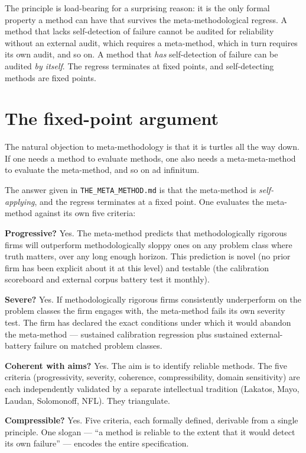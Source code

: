 \documentclass[11pt,letterpaper]{article}
\newcommand{\file}[1]{\texttt{#1}}
\begin{document}
The principle is load-bearing for a surprising reason: it is the only formal property a method can have that survives the meta-methodological regress. A method that lacks self-detection of failure cannot be audited for reliability without an external audit, which requires a meta-method, which in turn requires its own audit, and so on. A method that \emph{has} self-detection of failure can be audited \emph{by itself}. The regress terminates at fixed points, and self-detecting methods are fixed points.

\section{The fixed-point argument}

The natural objection to meta-methodology is that it is turtles all the way down. If one needs a method to evaluate methods, one also needs a meta-meta-method to evaluate the meta-method, and so on ad infinitum.

The answer given in \file{THE\_META\_METHOD.md} is that the meta-method is \emph{self-applying}, and the regress terminates at a fixed point. One evaluates the meta-method against its own five criteria:

\textbf{Progressive?} Yes. The meta-method predicts that methodologically rigorous firms will outperform methodologically sloppy ones on any problem class where truth matters, over any long enough horizon. This prediction is novel (no prior firm has been explicit about it at this level) and testable (the calibration scoreboard and external corpus battery test it monthly).

\textbf{Severe?} Yes. If methodologically rigorous firms consistently underperform on the problem classes the firm engages with, the meta-method fails its own severity test. The firm has declared the exact conditions under which it would abandon the meta-method --- sustained calibration regression plus sustained external-battery failure on matched problem classes.

\textbf{Coherent with aims?} Yes. The aim is to identify reliable methods. The five criteria (progressivity, severity, coherence, compressibility, domain sensitivity) are each independently validated by a separate intellectual tradition (Lakatos, Mayo, Laudan, Solomonoff, NFL). They triangulate.

\textbf{Compressible?} Yes. Five criteria, each formally defined, derivable from a single principle. One slogan --- ``a method is reliable to the extent that it would detect its own failure'' --- encodes the entire specification.
\end{document}
